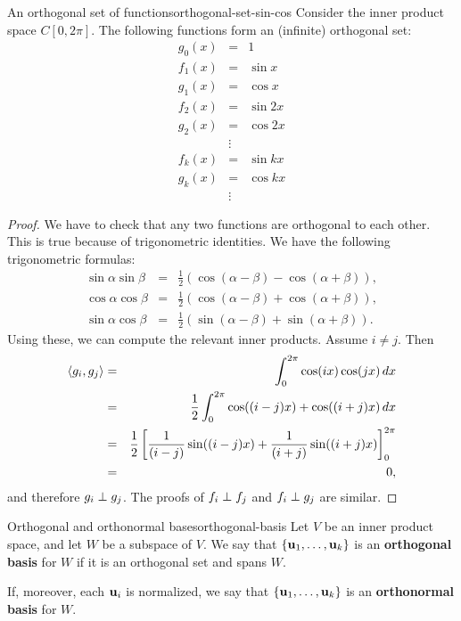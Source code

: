 \begin{example}{An orthogonal set of functions}{orthogonal-set-sin-cos}
  Consider the inner product space $C[0,2\pi]$. The following
  functions form an (infinite) orthogonal set:
  \begin{eqnarray*}
    g_0(x) &=& 1 \\
    f_1(x) &=& \sin x \\
    g_1(x) &=& \cos x \\
    f_2(x) &=& \sin 2x \\
    g_2(x) &=& \cos 2x \\
    &\vdots& \\
    f_k(x) &=& \sin kx \\
    g_k(x) &=& \cos kx \\
    &\vdots&
  \end{eqnarray*}
\end{example}

\begin{proof}
  We have to check that any two functions are orthogonal to each
  other. This is true because of trigonometric identities. We have the
  following trigonometric formulas:
  \begin{eqnarray*}
    \sin\alpha\sin\beta &=& \frac{1}{2}(\cos(\alpha-\beta) - \cos(\alpha+\beta)), \\
    \cos\alpha\cos\beta &=& \frac{1}{2}(\cos(\alpha-\beta) + \cos(\alpha+\beta)), \\
    \sin\alpha\cos\beta &=& \frac{1}{2}(\sin(\alpha-\beta) + \sin(\alpha+\beta)).
  \end{eqnarray*}
  Using these, we can compute the relevant inner products. Assume $i\neq j$. Then
  \begin{eqnarray*}
    \langle g_i,g_j\rangle
    &=& \int_{0}^{2\pi} \cos(ix)\cos(jx)\,dx \\
    &=& \frac{1}{2}\int_{0}^{2\pi} \cos((i-j)x) + \cos((i+j)x)\,dx \\
    &=& \frac{1}{2}\left[\frac{1}{(i-j)} \sin((i-j)x) + \frac{1}{(i+j)}
      \sin((i+j)x)\right]_{0}^{2\pi} \\
    &=& 0,
  \end{eqnarray*}
  and therefore $g_i\perp g_j$. The proofs of $f_i\perp f_j$ and
  $f_i\perp g_j$ are similar.
\end{proof}

\begin{definition}{Orthogonal and orthonormal bases}{orthogonal-basis}
  Let $V$ be an inner product space, and let $W$ be a subspace of
  $V$. We say that $\set{\vect{u}_1,\ldots,\vect{u}_k}$ is an
  \textbf{orthogonal basis}%
   for $W$ if it is an orthogonal set and
  spans $W$.
  \smallskip\smallskip

  If, moreover, each $\vect{u}_i$ is normalized, we say that
  $\set{\vect{u}_1,\ldots,\vect{u}_k}$ is an \textbf{orthonormal
    basis}%
   for $W$.
\end{definition}

